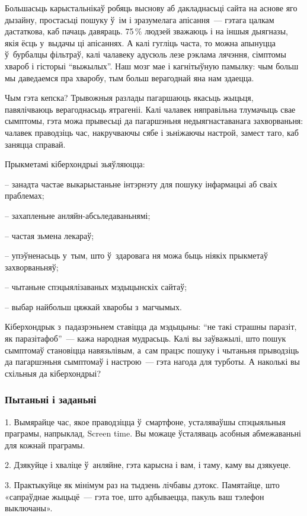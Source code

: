 Большасьць карыстальнікаў робяць выснову аб дакладнасьці сайта на аснове яго дызайну, простасьці пошуку ў~ім і зразумелага апісання~--- гэтага цалкам дастаткова, каб пачаць давяраць. 75\,\% людзей зважаюць і на іншыя дыягназы, якія ёсць у~выдачы ці апісаннях. А калі гугліць часта, то можна апынуцца ў~бурбалцы фільтраў, калі чалавеку адусюль лезе рэклама лячэння, сімптомы хвароб і гісторыі ``выжылых''. Наш мозг мае і кагнітыўную памылку: чым больш мы даведаемся пра хваробу, тым больш верагоднай яна нам здаецца.

Чым гэта кепска? Трывожныя разлады пагаршаюць якасьць жыцьця, павялічваюць верагоднасьць ятрагеніі. Калі чалавек няправільна тлумачыць свае сымптомы, гэта можа прывесьці да пагаршэньня недыягнаставанага захворваньня: чалавек праводзіць час, накручваючы сябе і зьніжаючы настрой, замест таго, каб заняцца справай. 

Прыкметамі кіберхондрыі зьяўляюцца: 

– занадта частае выкарыстаньне інтэрнэту для пошуку інфармацыі аб сваіх праблемах;

– захапленьне анляйн-абсьледаваньнямі;

– частая зьмена лекараў;

– упэўненасьць у~тым, што ў~здаровага ня можа быць ніякіх прыкметаў захворваньняў;

– чытаньне спэцыялізаваных мэдыцынскіх сайтаў;

– выбар найбольш цяжкай хваробы з~магчымых.

Кіберхондрык з~падазрэньнем ставіцца да мэдыцыны: ``не такі страшны паразіт, як паразітафоб''~--- кажа народная мудрасьць. Калі вы заўважылі, што пошук сымптомаў становіцца навязьлівым, а~сам працэс пошуку і чытаньня прыводзіць да пагаршэньня сымптомаў і настрою~--- гэта нагода для турботы. А наколькі вы схільныя да кіберхондрыі?

\subsubsection{Пытаньні і заданьні}

1. Вымярайце час, якое праводзіцца ў~смартфоне, усталяваўшы спэцыяльныя праграмы, напрыклад, Screen time. Вы можаце ўсталяваць асобныя абмежаваньні для кожнай праграмы.

2. Дзякуйце і хваліце ў~анляйне, гэта карысна і вам, і таму, каму вы дзякуеце.

3. Практыкуйце як мінімум раз на тыдзень лічбавы дэтокс. Памятайце, што «сапраўднае жыцьцё~--- гэта тое, што адбываецца, пакуль ваш тэлефон выключаны».

